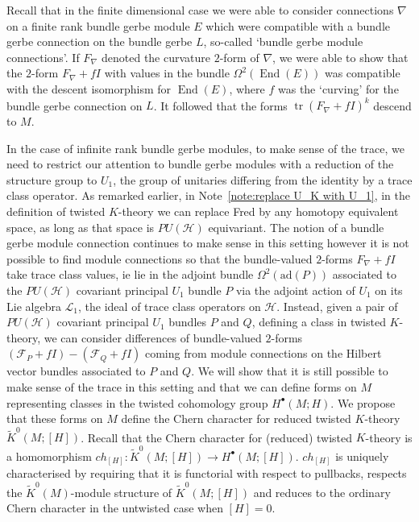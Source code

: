 \documentclass[a4paper,reqno]{amsart}
\DeclareMathOperator{\End}{End}
\DeclareMathOperator{\tr}{tr}
\theoremstyle{plain}
\theoremstyle{definition}
\theoremstyle{remark}
\numberwithin{equation}{section}
\numberwithin{figure}{section}
\newcommand{\<}{\langle}
\renewcommand{\>}{\rangle}
\newcommand{\ad}{\text{ad}}
\begin{document}
Recall that in the finite dimensional case we were able 
to consider connections $\nabla$ on a finite rank bundle gerbe module 
$E$ which were compatible with a bundle gerbe connection 
on the bundle gerbe $L$, so-called `bundle gerbe 
module connections'.  If $F_{\nabla}$ denoted the 
curvature $2$-form of $\nabla$, we were able to show 
that the $2$-form $F_{\nabla} + fI$ with values in the 
bundle $\Omega^2(\End(E))$ was compatible with the descent isomorphism 
for $\End(E)$, where $f$ was the `curving' for the 
bundle gerbe connection on $L$.  It followed that the 
forms $\tr(F_{\nabla} + fI)^k$ descend to $M$.   

In the case of infinite rank bundle gerbe modules, to make 
sense of the trace, we need to restrict our attention to 
bundle gerbe modules with a reduction of the structure 
group to $U_1$, the group of unitaries differing from the 
identity by a trace class operator.  As remarked earlier, 
in Note~\ref{note:replace U_K with U_1}, 
in the definition of twisted $K$-theory 
we can replace Fred by any homotopy equivalent space, as 
long as that space is $PU(\mathcal{H})$ equivariant.  
The notion of a bundle 
gerbe module connection continues to make sense in this 
setting however it is not possible to find module connections 
so that the bundle-valued $2$-forms $F_{\nabla} + fI$ 
take trace class values, ie lie in the adjoint bundle 
$\Omega^2 (\ad(P))$ associated to the $PU(\mathcal{H})$ covariant 
principal $U_1$ bundle $P$ via the adjoint action of 
$U_1$ on its Lie algebra $\mathcal{L}_1$, the ideal 
of trace class operators on $\mathcal{H}$.  Instead, 
given a pair of $PU(\mathcal{H})$ covariant principal 
$U_1$ bundles $P$ and $Q$, defining a class in 
twisted $K$-theory, we can consider differences of 
bundle-valued $2$-forms $(\mathcal{F}_P + fI) - (\mathcal{F}_Q 
+fI)$ coming from module connections on the  
Hilbert vector bundles associated to $P$ and $Q$.  We will 
show that it is still possible to make sense of the 
trace in this setting and that we can define 
forms on $M$ representing classes in the 
twisted cohomology group $H^{\bullet}(M;H)$.  We propose that 
these forms on $M$ define the Chern character for reduced twisted 
$K$-theory $\tilde{K}^0(M;[H])$.  Recall that the Chern character for 
(reduced) twisted $K$-theory is a homomorphism $ch_{[H]}\colon 
\tilde{K}^0(M;[H])\to H^\bullet(M;[H])$.  $ch_{[H]}$ is 
uniquely characterised by requiring that it is functorial 
with respect to pullbacks, respects the 
$\tilde{K}^0(M)$-module structure of $\tilde{K}^0(M;[H])$ 
and reduces to the ordinary Chern character in the 
untwisted case when $[H] = 0$.  
      
\end{document}
